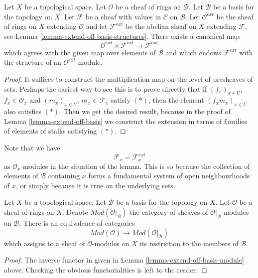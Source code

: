\begin{lemma}
\label{lemma-extend-off-basis-module}
Let $X$ be a topological space. Let $\mathcal{O}$
be a sheaf of rings on $\mathcal{B}$.
Let $\mathcal{B}$ be a basis for the topology on $X$.
Let $\mathcal{F}$ be a sheaf with values in $\mathcal{C}$
on $\mathcal{B}$. Let $\mathcal{O}^{ext}$ be the sheaf
of rings on $X$ extending $\mathcal{O}$ and let
$\mathcal{F}^{ext}$ be the abelian sheaf on $X$ extending
$\mathcal{F}$, see Lemma \ref{lemma-extend-off-basis-structures}.
There exists a canonical map
$$
\mathcal{O}^{ext} \times \mathcal{F}^{ext}
\longrightarrow
\mathcal{F}^{ext}
$$
which agrees with the given map over elements of $\mathcal{B}$
and which endows $\mathcal{F}^{ext}$ with the structure
of an $\mathcal{O}^{ext}$-module.
\end{lemma}

\begin{proof}
It suffices to construct the multiplication map
on the level of presheaves of sets. Perhaps the easiest
way to see this is to prove directly that if
$(f_x)_{x \in U}$, $f_x \in \mathcal{O}_x$
and
$(m_x)_{x \in U}$, $m_x \in \mathcal{F}_x$
satisfy $(*)$, then the element
$(f_xm_x)_{x \in U}$ also satisfies $(*)$.
Then we get the desired result, because in the proof
of Lemma \ref{lemma-extend-off-basis} we construct the extension
in terms of families of elements of stalks satisfying $(*)$.
\end{proof}

\noindent
Note that we have
$$
\mathcal{F}_x = \mathcal{F}_x^{ext}
$$
as $\mathcal{O}_x$-modules in the situation of the lemma.
This is so because the collection of elements of $\mathcal{B}$ containing
$x$ forms a fundamental system of open neighbourhoods of $x$, or
simply because it is true on the underlying sets.

\begin{lemma}
\label{lemma-restrict-basis-equivalence-modules}
Let $X$ be a topological space.
Let $\mathcal{B}$ be a basis for the topology on $X$.
Let $\mathcal{O}$ be a sheaf of rings on $X$.
Denote $\textit{Mod}(\mathcal{O}|_\mathcal{B})$ the category of
sheaves of $\mathcal{O}|_{\mathcal{B}}$-modules on $\mathcal{B}$.
There is an equivalence of categories
$$
\textit{Mod}(\mathcal{O})
\longrightarrow
\textit{Mod}(\mathcal{O}|_\mathcal{B})
$$
which assigns to a sheaf of $\mathcal{O}$-modules on $X$ its restriction to
the members of $\mathcal{B}$.
\end{lemma}

\begin{proof}
The inverse functor in given in
Lemma \ref{lemma-extend-off-basis-module} above.
Checking the obvious functorialities is left to the reader.
\end{proof}

